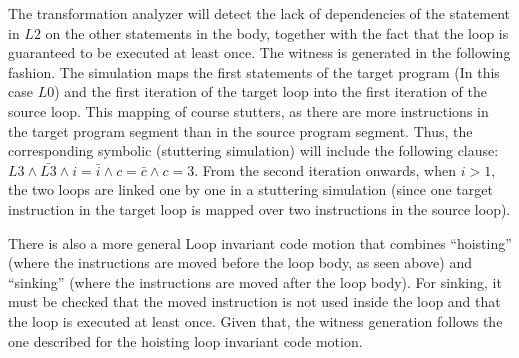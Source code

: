 The transformation analyzer will detect the lack of dependencies of the statement in $L2$ on the other statements in the body, together with the fact that the loop is guaranteed to be executed at least once. The witness is generated in the following fashion. The simulation maps the first statements of the target program (In this case $L0$) and the first iteration of the target loop into the first iteration of the source loop. This mapping of course stutters, as there are more instructions in the target program segment than in the source program segment. Thus, the corresponding symbolic (stuttering simulation) will include the following clause: $L3 \land \bar{L3} \land i=\bar{i} \land c=\bar{c} \land c=3$. From the second iteration onwards, when $i>1$, the two loops are linked one by one in a stuttering simulation (since one target instruction in the target loop is mapped over two instructions in the source loop).

There is also a more general Loop invariant code motion that combines ``hoisting'' (where the instructions are moved before the loop body, as seen above) and ``sinking'' (where the instructions are moved after the loop body). For sinking, it must be checked that the moved instruction is not used inside the loop and that the loop is executed at least once. Given that, the witness generation follows the one described for the hoisting loop invariant code motion.
